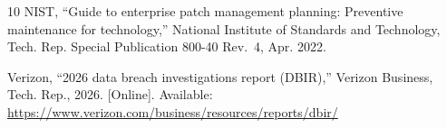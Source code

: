 \documentclass[journal]{IEEEtran}
\begin{document}
\begin{thebibliography}{10}
{NIST}, ``Guide to enterprise patch management planning: Preventive maintenance
  for technology,'' National Institute of Standards and Technology, Tech. Rep.
  Special Publication 800-40 Rev.~4, Apr. 2022.

\BIBentryALTinterwordspacing
{Verizon}, ``2026 data breach investigations report ({DBIR}),'' Verizon
  Business, Tech. Rep., 2026. [Online]. Available:
  \url{https://www.verizon.com/business/resources/reports/dbir/}
\BIBentrySTDinterwordspacing

\end{thebibliography}
\end{document}
